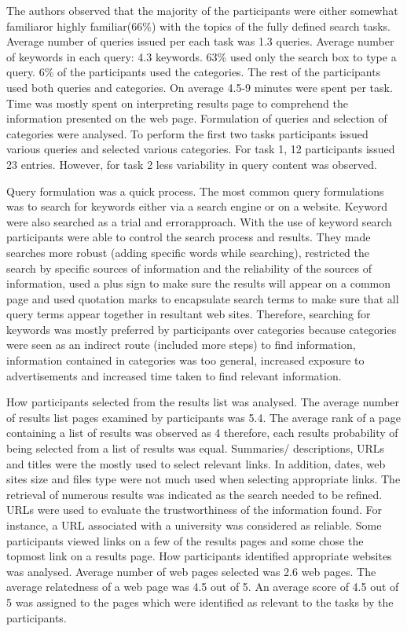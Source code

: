 \documentclass[]{article}
\begin{document}
\begin{enumerate}
The authors observed that the majority of the participants were either \textquotesingle somewhat familiar\textquotesingle or \textquotesingle highly familiar\textquotesingle (66\%) with the topics of the fully defined search tasks. Average number of queries issued per each task was 1.3 queries. Average number of keywords in each query: 4.3 keywords. 63\% used only the search box to type a query. 6\% of the participants used the categories. The rest of the participants used both queries and categories. On average 4.5-9 minutes were spent per task. Time was mostly spent on interpreting results page to comprehend the information presented on the web page. Formulation of queries and selection of categories were analysed. To perform the first two tasks participants issued various queries and selected various categories. For task 1, 12 participants issued 23 entries. However, for task 2 less variability in query content was observed. 

Query formulation was a quick process. The most common query formulations was to search for keywords either via a search engine or on a website. Keyword were also searched as a \textquotesingle trial and error\textquotesingle approach. With the use of keyword search participants were able to control the search process and results. They made searches more robust (adding specific words while searching), restricted the search by specific sources of information and the reliability of the sources of information, used a plus sign to make sure the results will appear on a common page and used quotation marks to encapsulate search terms to make sure that all query terms appear together in resultant web sites. Therefore, searching for keywords was mostly preferred by participants over categories because categories were seen as an indirect route (included more steps) to find information, information contained in categories was too general, increased exposure to advertisements and increased time taken to find relevant information.

How participants selected from the results list was analysed. The average number of results list pages examined by participants was 5.4. The average rank of a page containing a list of results was observed as 4 therefore, each result\textquotesingle s probability of being selected from a list of results was equal. Summaries/ descriptions, URLs and titles were the mostly used to select relevant links. In addition, dates, web site\textquotesingle s size and file\textquotesingle s type were not much used when selecting appropriate links. The retrieval of numerous results was indicated as the search needed to be refined. URLs were used to evaluate the trustworthiness of the information found. For instance, a URL associated with a university was considered as reliable. Some participants viewed links on a few of the results pages and some chose the topmost link on a results page. How participants identified appropriate websites was analysed. Average number of web pages selected was 2.6 web pages. The average relatedness of a web page was 4.5 out of 5. An average score of 4.5 out of 5 was assigned to the pages which were identified as relevant to the tasks by the participants. 


\end{enumerate}
\end{document}
